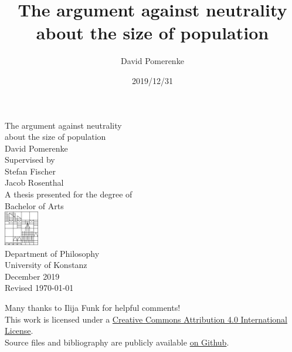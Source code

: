 \documentclass{report}
\title{The argument against neutrality about the size of population}
\author{David Pomerenke}
\date{2019/12/31}
\begin{document}
\begin{titlepage}
    \begin{center}
        \huge
        The argument against neutrality\\
        about the size of population\\
        \vspace*{1cm}
        \large
        David Pomerenke\\
        \vfill
        Supervised by\\
        Stefan Fischer\\
        Jacob Rosenthal\\
        \vfill
        A thesis presented for the degree of\\
        Bachelor of Arts\\
        \vfill
        \includegraphics[width=1.5cm]{0-logo.png}\\
        Department of Philosophy\\
        University of Konstanz\\
        December 2019\\
        Revised \today
    \end{center}
\end{titlepage}

\tableofcontents
\vfill

\begin{center}
    \footnotesize
    Many thanks to Ilija Funk for helpful comments! \\
    This work is licensed under a \href{http://creativecommons.org/licenses/by/4.0/}{Creative Commons Attribution 4.0 International License}. \\
    Source files and bibliography are publicly available \href{https://github.com/davidpomerenke/ba}{on Github}.
\end{center}













\vfill
\centering
\end{document}
